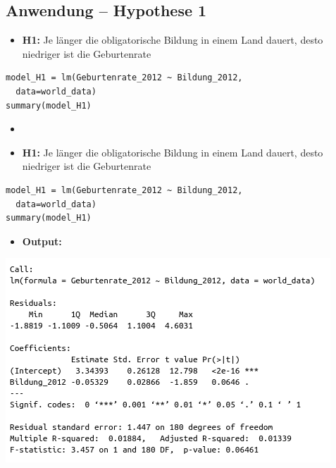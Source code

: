 \documentclass[aspectratio=169, journal, x11names, unknownkeysallowed, hyperref={colorlinks,
linkcolor = SS2,
urlcolor  = F3,
citecolor = F3,
anchorcolor = A4}, 12pt]{beamer}
\begin{document}
  \subsection{Anwendung -- Hypothese 1}
  \begin{frame}[t, fragile]
    \begin{minipage}[t]{0.45\textwidth}
        \begin{itemize}
            \item[] \textbf{H1:} Je länger die obligatorische Bildung in einem Land dauert, desto niedriger ist die Geburtenrate
          \end{itemize}
\begin{lstlisting}
model_H1 = lm(Geburtenrate_2012 ~ Bildung_2012, 
  data=world_data)
summary(model_H1)
\end{lstlisting} 
      \end{minipage}
      \begin{minipage}[t]{0.45\textwidth}
        \begin{itemize}
          \item[]
        \end{itemize}
      \end{minipage}
  \end{frame}

  \begin{frame}[t, fragile]
    \begin{minipage}[t]{0.45\textwidth}
        \begin{itemize}
            \item[] \textbf{H1:} Je länger die obligatorische Bildung in einem Land dauert, desto niedriger ist die Geburtenrate
          \end{itemize}
\begin{lstlisting}
model_H1 = lm(Geburtenrate_2012 ~ Bildung_2012, 
  data=world_data)
summary(model_H1)
\end{lstlisting} 
      \end{minipage}
      \begin{minipage}[t]{0.45\textwidth}
        \begin{itemize}
          \item[] \textbf{Output:}
        \end{itemize}
        \begin{center}
          \includegraphics[scale=0.3]{../Plots/summary_H1.png}
        \end{center}
      \end{minipage}
  \end{frame}
\end{document}

